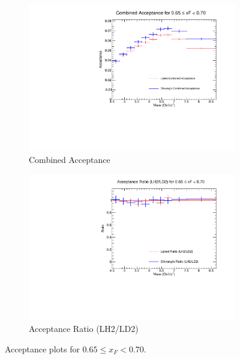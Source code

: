 \documentclass[11pt]{article}
\begin{document}
\begin{figure}[p]
\begin{subfigure}[b]{0.48\textwidth}
       \includegraphics[width=\linewidth]{./acceptancePlots/Combined_acceptance_xF_bin_13.pdf}
       \caption{Combined Acceptance}
    \end{subfigure}\hfill
    \begin{subfigure}[b]{0.48\textwidth}
       \includegraphics[width=\linewidth]{./acceptancePlots/Acceptance_ratio_xF_bin_13.pdf}
       \caption{Acceptance Ratio (LH2/LD2)}
    \end{subfigure}
    \caption{Acceptance plots for $0.65 \le x_F < 0.70$.}
\end{figure}
\end{document}
